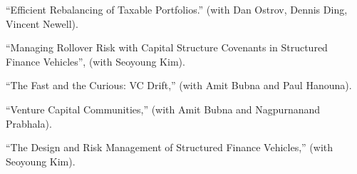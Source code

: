 \documentclass{article}
\begin{document}
\begin{etaremune}
\setlength\itemsep{-0.3em}






\item ``Efficient Rebalancing of Taxable Portfolios.'' (with Dan Ostrov, Dennis Ding, Vincent Newell). 

\item ``Managing Rollover Risk with Capital Structure Covenants in Structured Finance Vehicles'', (with Seoyoung Kim).



\item ``The Fast and the Curious: VC Drift,'' (with Amit Bubna and Paul Hanouna). 


\item ``Venture Capital Communities,'' (with Amit Bubna and Nagpurnanand Prabhala). 

\item ``The Design and Risk Management of Structured Finance Vehicles,'' (with Seoyoung Kim).









\end{etaremune}
\end{document}
